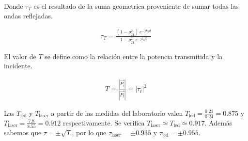 \documentclass[spanish, a4paper, nobib]{tufte-handout}
\begin{document}
Donde $\tau_T$ es el resultado de la suma geometrica proveniente de sumar todas las ondas reflejadas.

\begin{align}
    \tau_T = \frac{(1-\rho_{21}^2)\, e^{-jk_2d}}{1-\rho_{21}^2\,e^{-jk_2d}}
\end{align}

El valor de $T$ se define como la relación entre la potencia transmitida y la incidente.

\begin{align}
    T = \frac{|\vec{P_i}|}{|\vec{P_t}|} = |\tau_t|^2
\end{align}

Las $T_{\text{led}}$ y $T_{\text{laser}}$ a partir de las medidas del laboratorio valen $T_{\text{led}}=\frac{\num{0.21}}{\num{0.24}}=\num{0.875}$ y $T_{\text{laser}}=\frac{\num{7.8}}{\num{8.55}}=\num{0.912}$ respectivamente. Se verifica $T_{\text{laser}}\simeq T_{\text{led}}\simeq \num{0.917}$. Además sabemos que $\tau=\pm\sqrt{T}$, por lo que $\tau_{\text{laser}}=\pm\num{0.935}$ y $\tau_{\text{led}}=\pm\num{0.955}$.
\end{document}
